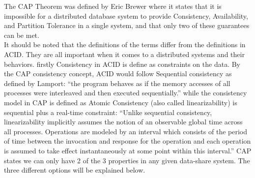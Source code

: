 \documentclass[a4paper,10pt,titlepage]{report}
\begin{document}
The CAP Theorem was defined by Eric Brewer\cite{CAP} where it states that it is impossible for a distributed database system to provide Consistency, Availability, and Partition Tolerance in a single system, and that only two of these guarantees can be met.\\
\vspace{5mm}
It should be noted that the definitions of the terms differ from the definitions in ACID. They are all important when it comes to a distributed systems and their behaviors. firstly Consistency in ACID is define as constraints on the data. By the CAP consistency concept, ACID would follow Sequential consistency as defined by Lamport\cite{lamport1993how}: “the program behaves as if the memory accesses of all processes were interleaved and then executed sequentially.” while the consistency model in CAP is defined as Atomic Consistency (also called linearizability) is sequential plus a real-time constraint: “Unlike sequential consistency, linearizability implicitly assumes the notion of an observable global time across all processes. Operations are modeled by an interval which consists of the period of time between the invocation and response for the operation and each operation is assumed to take effect instantaneously at some point within this interval.” \cite{CSL-TR-95-685}
\vspace{5mm}
CAP states we can only have 2 of the 3 properties in any given data-share system. The three different options will be explained below.
\end{document}
